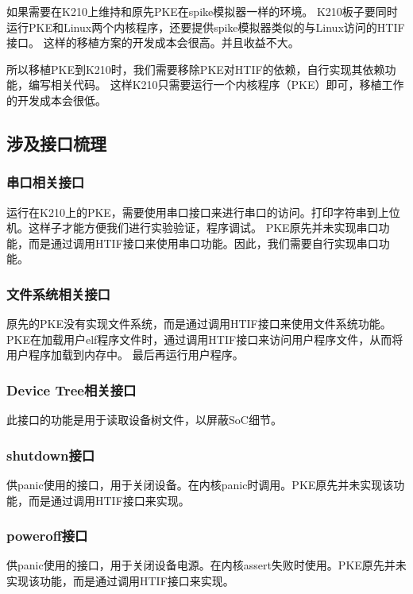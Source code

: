 如果需要在K210上维持和原先PKE在spike模拟器一样的环境。
K210板子要同时运行PKE和Linux两个内核程序，还要提供spike模拟器类似的与Linux访问的HTIF接口。
这样的移植方案的开发成本会很高。并且收益不大。

所以移植PKE到K210时，我们需要移除PKE对HTIF的依赖，自行实现其依赖功能，编写相关代码。
这样K210只需要运行一个内核程序（PKE）即可，移植工作的开发成本会很低。

\subsection{涉及接口梳理}

\subsubsection{串口相关接口}
运行在K210上的PKE，需要使用串口接口来进行串口的访问。打印字符串到上位机。这样子才能方便我们进行实验验证，程序调试。
PKE原先并未实现串口功能，而是通过调用HTIF接口来使用串口功能。因此，我们需要自行实现串口功能。

\subsubsection{文件系统相关接口}

原先的PKE没有实现文件系统，而是通过调用HTIF接口来使用文件系统功能。
PKE在加载用户elf程序文件时，通过调用HTIF接口来访问用户程序文件，从而将用户程序加载到内存中。
最后再运行用户程序。

\subsubsection{Device Tree相关接口}

此接口的功能是用于读取设备树文件，以屏蔽SoC细节。

\subsubsection{shutdown接口}

供panic使用的接口，用于关闭设备。在内核panic时调用。PKE原先并未实现该功能，而是通过调用HTIF接口来实现。

\subsubsection{poweroff接口}

供panic使用的接口，用于关闭设备电源。在内核assert失败时使用。PKE原先并未实现该功能，而是通过调用HTIF接口来实现。

